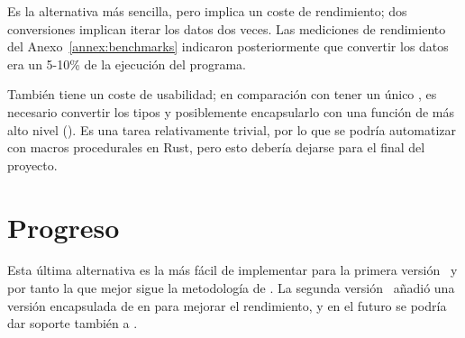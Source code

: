 Es la alternativa más sencilla, pero implica un coste de rendimiento; dos
conversiones implican iterar los datos dos veces. Las mediciones de rendimiento
del Anexo~\ref{annex:benchmarks} indicaron posteriormente que convertir los
datos era un 5-10\% de la ejecución del programa.

También tiene un coste de usabilidad; en comparación con tener un único
, es necesario convertir los tipos y posiblemente encapsularlo con
una función de más alto nivel (). Es una tarea
relativamente trivial, por lo que se podría automatizar con macros procedurales
en Rust, pero esto debería dejarse para el final del proyecto.

\section{Progreso}

Esta última alternativa es la más fácil de implementar para la primera
versión~\cite{pdk_v1} y por tanto la que mejor sigue la metodología de \work. La
segunda versión~\cite{pdk_v2} añadió una versión encapsulada de 
en \abistable para mejorar el rendimiento, y en el futuro se podría dar soporte
también a .
